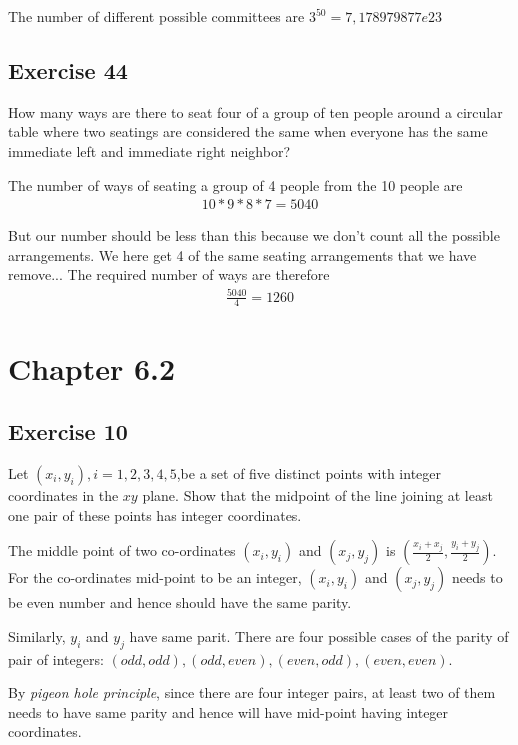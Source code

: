 \documentclass[12pt]{article}
\begin{document}
    The number of different possible committees are $3^{50}=7,178979877e23$

    \subsection{Exercise 44}
    How many ways are there to seat four of a group of ten people around a circular table where two seatings are considered the same when everyone has the same immediate left and immediate right neighbor?

    The number of ways of seating a group of 4 people from the 10 people are
    \begin{equation}
      \begin{split}
        10*9*8*7 =5040
      \end{split}
    \end{equation}

    But our number should be less than this because we don't count all the possible arrangements. We here get 4 of the same seating arrangements that we have remove...
    The required number of ways are therefore
    \begin{equation}
      \begin{split}
        \frac{5040}{4}=1260
      \end{split}
    \end{equation}

    \section{Chapter 6.2}
    \subsection{Exercise 10}
    Let $(x_i,y_i), i = 1,2,3,4,5$,be a set of five distinct points with integer coordinates in the $xy$ plane. Show that the midpoint of the line joining at least one pair of these points has integer coordinates.

    The middle point of two co-ordinates $(x_i,y_i)$ and $(x_j,y_j)$ is $(\frac{x_i+x_j}{2},\frac{y_i+y_j}{2})$. For the co-ordinates mid-point to be an integer,  $(x_i,y_i)$ and $(x_j,y_j)$ needs to be even number and hence should have the same parity.

    Similarly, $y_i$ and $y_j$ have same parit. There are four possible cases of the parity of pair of integers: $(odd,odd),(odd,even),(even,odd),(even,even)$.

    By \textit{pigeon hole principle}, since there are four integer pairs, at least two of them needs to have same parity and hence will have mid-point having integer coordinates.
\end{document}

